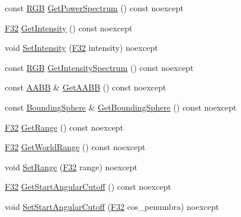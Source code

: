 \begin{DoxyCompactItemize}
\item 
const \mbox{\hyperlink{structmage_1_1_r_g_b}{R\+GB}} \mbox{\hyperlink{classmage_1_1rendering_1_1_spot_light_a6dfa36c830bfa2878c04740c8c5f2e3b}{Get\+Power\+Spectrum}} () const noexcept
\item 
\mbox{\hyperlink{namespacemage_aa97e833b45f06d60a0a9c4fc22ae02c0}{F32}} \mbox{\hyperlink{classmage_1_1rendering_1_1_spot_light_ac3fe64c6d599149cf569693f74ac41e8}{Get\+Intensity}} () const noexcept
\item 
void \mbox{\hyperlink{classmage_1_1rendering_1_1_spot_light_aa59f043d14fb1e66377c9462c350717f}{Set\+Intensity}} (\mbox{\hyperlink{namespacemage_aa97e833b45f06d60a0a9c4fc22ae02c0}{F32}} intensity) noexcept
\item 
const \mbox{\hyperlink{structmage_1_1_r_g_b}{R\+GB}} \mbox{\hyperlink{classmage_1_1rendering_1_1_spot_light_a049401f9c26b106acddfcb7ec09b0418}{Get\+Intensity\+Spectrum}} () const noexcept
\item 
const \mbox{\hyperlink{classmage_1_1_a_a_b_b}{A\+A\+BB}} \& \mbox{\hyperlink{classmage_1_1rendering_1_1_spot_light_a09e58c11a2f81de811c4d8e51c5d13c3}{Get\+A\+A\+BB}} () const noexcept
\item 
const \mbox{\hyperlink{classmage_1_1_bounding_sphere}{Bounding\+Sphere}} \& \mbox{\hyperlink{classmage_1_1rendering_1_1_spot_light_a003e42ab1d3059ae5750893bcaa8e0b3}{Get\+Bounding\+Sphere}} () const noexcept
\item 
\mbox{\hyperlink{namespacemage_aa97e833b45f06d60a0a9c4fc22ae02c0}{F32}} \mbox{\hyperlink{classmage_1_1rendering_1_1_spot_light_a14383d05dafe535cf0cc162e3015181e}{Get\+Range}} () const noexcept
\item 
\mbox{\hyperlink{namespacemage_aa97e833b45f06d60a0a9c4fc22ae02c0}{F32}} \mbox{\hyperlink{classmage_1_1rendering_1_1_spot_light_a13b573af8d6131b6bf426362088a2a56}{Get\+World\+Range}} () const noexcept
\item 
void \mbox{\hyperlink{classmage_1_1rendering_1_1_spot_light_a87711b67a7a16809711f9841e4708720}{Set\+Range}} (\mbox{\hyperlink{namespacemage_aa97e833b45f06d60a0a9c4fc22ae02c0}{F32}} range) noexcept
\item 
\mbox{\hyperlink{namespacemage_aa97e833b45f06d60a0a9c4fc22ae02c0}{F32}} \mbox{\hyperlink{classmage_1_1rendering_1_1_spot_light_ab865663954e848ad42c84e759c7ceea7}{Get\+Start\+Angular\+Cutoff}} () const noexcept
\item 
void \mbox{\hyperlink{classmage_1_1rendering_1_1_spot_light_a01db83a4c9e64ff48dc4152359abec84}{Set\+Start\+Angular\+Cutoff}} (\mbox{\hyperlink{namespacemage_aa97e833b45f06d60a0a9c4fc22ae02c0}{F32}} cos\+\_\+penumbra) noexcept

\end{DoxyCompactItemize}
